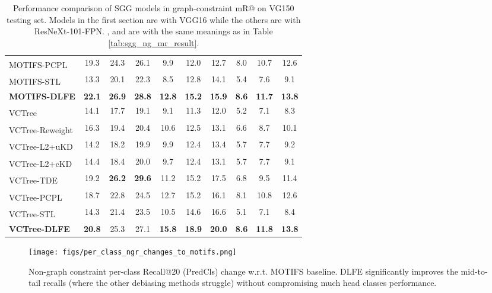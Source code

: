 \documentclass[sigconf]{acmart}
\begin{document}
\begin{table*}[htbp]
{\begin{tabular}{l|c c c|c c c|c c c}
MOTIFS-PCPL\textsuperscript{} \cite{yan2020pcpl} & 19.3 & 24.3 & 26.1 & 9.9 & 12.0 & 12.7 & 8.0 & 10.7 & 12.6 \\
MOTIFS-STL\textsuperscript{} \cite{chen2019soft} & 13.3 & 20.1 & 22.3 & 8.5 & 12.8 & 14.1 & 5.4 & 7.6 & 9.1 \\
\textbf{MOTIFS-DLFE} & \textbf{22.1} & \textbf{26.9} & \textbf{28.8} & \textbf{12.8} & \textbf{15.2} & \textbf{15.9} & \textbf{8.6} & \textbf{11.7} & \textbf{13.8} \\
\hline
VCTree\textsuperscript{} \cite{tang2019learning,tang2020unbiased} & 14.1 & 17.7 & 19.1 & 9.1 & 11.3 & 12.0 & 5.2 & 7.1 & 8.3 \\
VCTree-Reweight\textsuperscript{} & 16.3 & 19.4 & 20.4 & 10.6 & 12.5 & 13.1 & 6.6 & 8.7 & 10.1\\
VCTree-L2+uKD\textsuperscript{} \cite{DBLP:conf/bmvc/WangPL20} & 14.2 & 18.2 & 19.9 & 9.9 & 12.4 & 13.4 & 5.7 & 7.7 & 9.2 \\ 
VCTree-L2+cKD\textsuperscript{} \cite{DBLP:conf/bmvc/WangPL20} & 14.4 & 18.4 & 20.0 & 9.7 & 12.4 & 13.1 & 5.7 & 7.7 & 9.1 \\ 
VCTree-TDE\textsuperscript{} \cite{tang2020unbiased} & 19.2 & \textbf{26.2} & \textbf{29.6} & 11.2 & 15.2 & 17.5 & 6.8 & 9.5 & 11.4 \\
VCTree-PCPL\textsuperscript{} \cite{yan2020pcpl} & 18.7 & 22.8 & 24.5 & 12.7 & 15.2 & 16.1 & 8.1 & 10.8 & 12.6 \\
VCTree-STL\textsuperscript{} \cite{chen2019soft} & 14.3 & 21.4 & 23.5  & 10.5 & 14.6 & 16.6 & 5.1 & 7.1 & 8.4 \\
\textbf{VCTree-DLFE} & \textbf{20.8} & 25.3 & 27.1 & \textbf{15.8} & \textbf{18.9} & \textbf{20.0} & \textbf{8.6} & \textbf{11.8} & \textbf{13.8} \\
\hline
\end{tabular}
}
\vspace{0.1em}
\caption{Performance comparison of SGG models in graph-constraint mR@ on VG150 \cite{krishna2017visual,xu2017scene} testing set. 
Models in the first section are with VGG16 while the others are with ResNeXt-101-FPN.
,  and  are with the same meanings as in Table \ref{tab:sgg_ng_mr_result}.
}
\label{tab:sgg_mr_result}
\vspace{-1.7em}
\end{table*}

\begin{figure*}[t!]
\begin{center}
\texttt{[image: figs/per\_class\_ngr\_changes\_to\_motifs.png]}
\end{center}
\vspace{-1.2em}
  \caption{Non-graph constraint per-class Recall@20 (PredCls) change w.r.t. MOTIFS baseline.
DLFE significantly improves the mid-to-tail recalls (where the other debiasing methods struggle) without compromising much head classes performance.}
\label{fig:recall_changes_to_smn}
\vspace{-1em}
\end{figure*}
\end{document}
